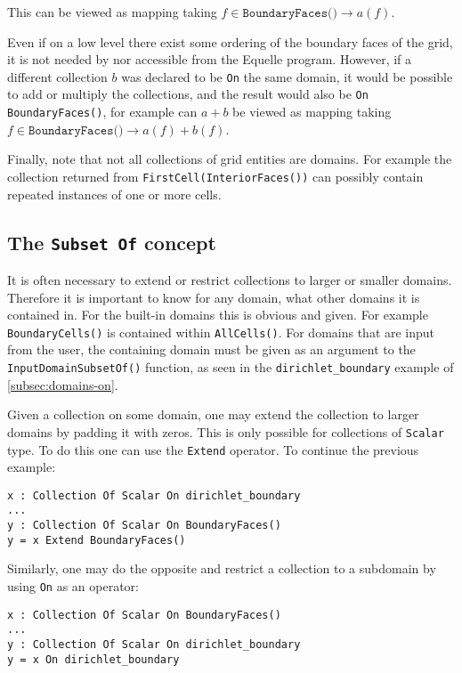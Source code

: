 \documentclass[11pt]{article}
\newcommand{\code}[1]{\texttt{#1}}
\begin{document}
This can be viewed as mapping taking $f \in \code{BoundaryFaces()} \to a(f)$.

Even if on a low level there exist some ordering of the boundary faces of the grid, it is
not needed by nor accessible from the Equelle program. However, if a different collection
$b$ was declared to be \code{On} the same domain, it would be possible to add or multiply
the collections, and the result would also be \code{On BoundaryFaces()}, for example can
$a + b$ be viewed as mapping taking $f \in \code{BoundaryFaces()} \to a(f) + b(f)$. 

Finally, note that not all collections of grid entities are domains. For example the
collection returned from \code{FirstCell(InteriorFaces())} can possibly contain repeated
instances of one or more cells.

\subsection{The \code{Subset Of} concept}
\label{subsec:subset-of}

It is often necessary to extend or restrict collections to larger or smaller
domains. Therefore it is important to know for any domain, what other domains it is
contained in. For the built-in domains this is obvious and given. For example
\code{BoundaryCells()} is contained within \code{AllCells()}. For domains that are input
from the user, the containing domain must be given as an argument to the
\code{InputDomainSubsetOf()} function, as seen in the \code{dirichlet\_boundary} example
of \ref{subsec:domains-on}.

Given a collection on some domain, one may extend the collection to larger domains by
padding it with zeros. This is only possible for collections of \code{Scalar} type. To do
this one can use the \code{Extend} operator. To continue the previous example:

\begin{verbatim}
x : Collection Of Scalar On dirichlet_boundary
...
y : Collection Of Scalar On BoundaryFaces()
y = x Extend BoundaryFaces()
\end{verbatim}

Similarly, one may do the opposite and restrict a collection to a subdomain by using
\code{On} as an operator:

\begin{verbatim}
x : Collection Of Scalar On BoundaryFaces()
...
y : Collection Of Scalar On dirichlet_boundary
y = x On dirichlet_boundary
\end{verbatim}
\end{document}
